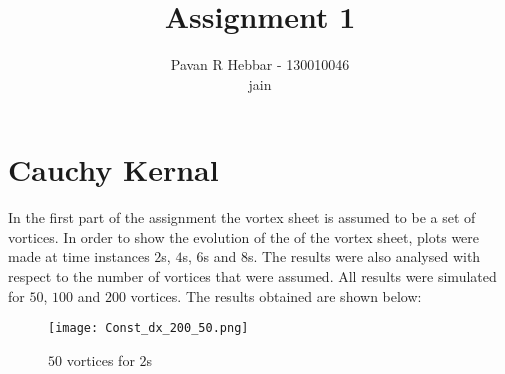 \documentclass[11pt, a4paper]{article}
\title{\textbf{Assignment 1}}
\author{Pavan R Hebbar - 130010046 \\ 
jain}
\begin{document}
\maketitle
\newpage

\section{Cauchy Kernal}
In the first part of the assignment the vortex sheet is assumed to be a set of vortices. In order to show the evolution of the
of the vortex sheet, plots were made at time instances $2$s, $4$s, $6$s and $8$s. The results were also analysed with respect
to the number of vortices that were assumed. All results were simulated for $50$, $100$ and $200$ vortices. The results
obtained are shown below:
\begin{figure}[H]
 \centering
 \texttt{[image: Const\_dx\_200\_50.png]}
 \caption{$50$ vortices for $2$s}
\end{figure}
\end{document}
